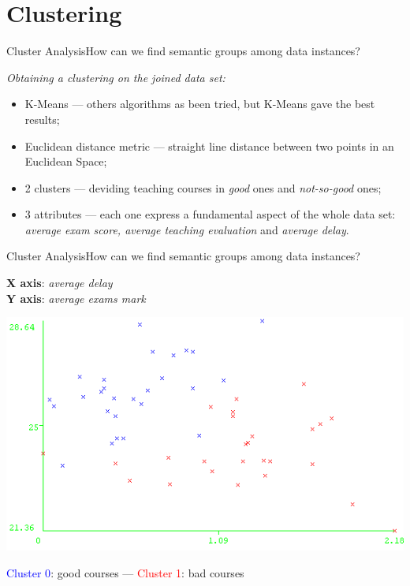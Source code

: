 \section{Clustering}

\begin{frame}{Cluster Analysis}{How can we find semantic groups among data instances?}

 \centering\textit{Obtaining a clustering on the joined data set:} \vspace{0,3cm}

	\begin{block}{}
		\begin{itemize}
			\item<1-> \alert{K-Means} --- others algorithms as been tried, but K-Means gave the best results;
            \item<2-> \alert{Euclidean distance metric} --- straight line distance between two points in an Euclidean Space;
			\item<3-> \alert{2 clusters} --- deviding teaching courses in \emph{good} ones and \emph{not-so-good} ones;
			\item<4-> \alert{3 attributes} --- each one express a fundamental aspect of the whole data set: \emph{average exam score, average teaching evaluation} and \emph{average delay}.
		\end{itemize}
	\end{block}

\end{frame}

\begin{frame}{Cluster Analysis}{How can we find semantic groups among data instances?}

    \textbf{X axis}: \emph{average delay} \\ \textbf{Y axis}: \emph{average exams mark}

    \vspace{0.1cm}
    \begin{centering}
        \hspace{0.5cm}\includegraphics[scale=0.46]{cluster1.png}
    \end{centering}

    \textcolor{blue}{Cluster 0}: good courses --- \textcolor{red}{Cluster 1}: bad courses

\end{frame}

